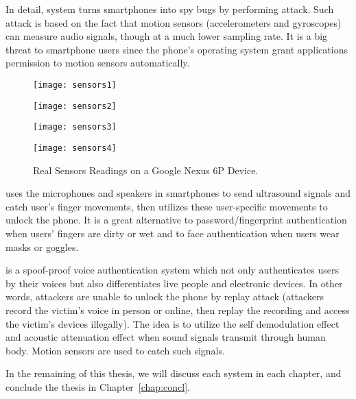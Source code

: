 In detail, {\systemName} system turns smartphones into spy bugs by performing {\attackName} attack. Such attack is  based on the fact that motion sensors (accelerometers and gyroscopes) can measure audio signals, though at a much lower sampling rate. It is a big threat to smartphone users since the phone's operating system grant applications permission to motion sensors automatically. 

\begin{landscape}
	\begin{figure*}[h]
		\begin{minipage}[t]{0.25\textwidth}
			\texttt{[image: sensors1]}
		\end{minipage}
		\hspace{.60in}
		\begin{minipage}[t]{0.25\textwidth}
			\texttt{[image: sensors2]}
		\end{minipage}
		\hspace{.60in}
		\begin{minipage}[t]{0.25\textwidth}
			\texttt{[image: sensors3]}
		\end{minipage}  
		\hspace{.60in}
		\begin{minipage}[t]{0.25\textwidth}
			\texttt{[image: sensors4]}
		\end{minipage}  
		\caption{Real Sensors Readings on a Google Nexus 6P Device.}
		\label{fig:sensors}
	\end{figure*}
\end{landscape}

{\uu} uses the microphones and speakers in smartphones to send ultrasound signals and catch user’s finger movements, then utilizes these user-specific movements to unlock the phone. It is a great alternative to password/fingerprint authentication when users' fingers are dirty or wet and to face authentication when users wear masks or goggles.
%


{\shortname} is a spoof-proof voice authentication system which not only authenticates users by their voices but also differentiates live people and electronic devices. In other words, attackers are unable to unlock the phone by replay attack (attackers record the victim's voice in person or online, then replay the recording and access the victim's devices illegally). The idea is to utilize the self demodulation effect and acoustic attenuation effect when sound signals transmit through human body. Motion sensors are used to catch such signals.


In the remaining of this thesis, we will discuss each system in each chapter, and conclude the thesis in Chapter~\ref{chap:concl}.


